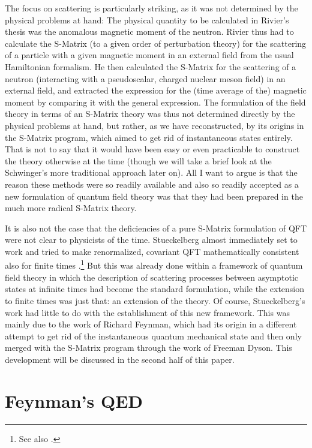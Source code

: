 \documentclass[12pt,a4paper]{article}
\begin{document}
The focus on scattering is particularly striking, as it was not determined by the physical problems at hand: The physical quantity to be calculated in Rivier's thesis was the anomalous magnetic moment of the neutron. Rivier thus had to calculate the S-Matrix (to a given order of perturbation theory) for the scattering of a particle with a given magnetic moment in an external field from the usual Hamiltonian formalism. He then calculated the S-Matrix for the scattering of a neutron (interacting with a pseudoscalar, charged nuclear meson field) in an external field, and extracted the expression for the (time average of the) magnetic moment by comparing it with the general expression. The formulation of the field theory in terms of an S-Matrix theory was thus not determined directly by the physical problems at hand, but rather, as we have reconstructed, by its origins in the S-Matrix program, which aimed to get rid of instantaneous states entirely. That is not to say that it would have been easy or even practicable to construct the theory otherwise at the time (though we will take a brief look at the Schwinger's more traditional approach later on). All I want to argue is that the reason these methods were so readily available and also so readily accepted as a new formulation of quantum field theory was that they had been prepared in the much more radical S-Matrix theory.

It is also not the case that the deficiencies of a pure S-Matrix formulation of QFT were not clear to physicists of the time. Stueckelberg almost immediately set to work and tried to make renormalized, covariant QFT mathematically consistent also for finite times \citep{stueckelberg_1951_relativistic}.\footnote{See also \citep{cianfrani_2008_stueckelberg}.} But this was already done within a framework of quantum field theory in which the description of scattering processes between asymptotic states at infinite times had become the standard formulation, while the extension to finite times was just that: an extension of the theory. Of course, Stueckelberg's work had little to do with the establishment of this new framework. This was mainly due to the work of Richard Feynman, which had its origin in a different attempt to get rid of the instantaneous quantum mechanical state and then only merged with the S-Matrix program through the work of Freeman Dyson. This development will be discussed in the second half of this paper.

  
 
\section{Feynman's QED}
\end{document}

